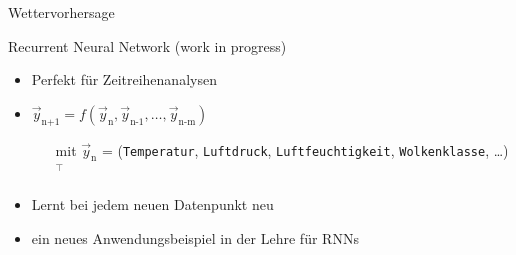 \begin{frame}[c]{Wettervorhersage}
	\begin{block}{Recurrent Neural Network \tiny\alert{(work in progress)}}
				\begin{itemize}
					\item Perfekt f\"ur Zeitreihenanalysen
					\item $\vec{y}_\text{n+1} = f(\vec{y}_\text{n}, \vec{y}_\text{n-1},
						\ldots, \vec{y}_\text{n-m})$
						\begin{itemize}
							\item[mit] $\vec{y}_\text{n}$ = (\texttt{Temperatur}, \texttt{Luftdruck},
						\texttt{Luftfeuchtigkeit}, \texttt{Wolkenklasse}, \ldots)$^\intercal$
						\end{itemize}
					\item Lernt bei jedem neuen Datenpunkt neu
					\item \alert{ein neues Anwendungsbeispiel in der Lehre f\"ur
						RNNs}
				\end{itemize}
				\vspace{-0.7cm}
	\end{block}
\end{frame}
